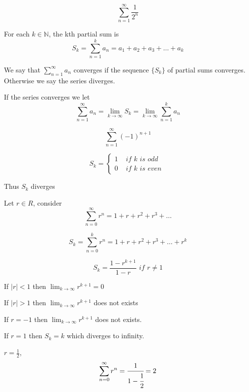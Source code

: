 \begin{exmp}
$$\sum_{n=1}^\infty \frac{1}{2^n}$$
\end{exmp}

\begin{defn}
For each $k\in \mathbb{N}$, the kth partial sum is $$S_k = \sum_{n=1}^k a_n = a_1+a_2+a_3+\dots + a_k$$

We say that $\sum_{n=1}^\infty a_n$ converges if the sequence $\{S_k\}$ of partial sums converges. Otherwise we say the series diverges.
\end{defn}

If the series converges we let $$\sum_{n=1}^\infty a_n = \lim_{k\to \infty} S_k = \lim_{k\to \infty} \sum_{n=1}^k a_n$$

\begin{exmp}
 $$\sum_{n=1}^\infty (-1)^{n+1}$$
 
\begin{equation*}
    S_k = \begin{cases}
        1 & \textit{ if k is odd }\\
        0 & \textit{ if k is even }
    \end{cases}
\end{equation*}
\end{exmp}

Thus $S_k$ diverges


Let $r\in R$, consider 
$$\sum_{n=0}^\infty r^n = 1+ r+r^2+r^3+\dots$$

$$S_k = \sum_{n=0}^k r^n = 1+ r+r^2+r^3+\dots+r^k$$

$$S_k = \frac{1-r^{k+1}}{1-r} \textit{ if } r \neq 1$$

\begin{note}

If $|r|< 1$ then $\lim_{k\to\infty} r^{k+1} = 0$

If $|r|> 1$ then $\lim_{k\to\infty} r^{k+1} $ does not exists

If $r = -1$ then $\lim_{k\to\infty} r^{k+1} $ does not exists.

If $r = 1 $ then $S_k = k$ which diverges to infinity.
\end{note}

\begin{exmp}
$r=\frac{1}{2}$, $$\sum_{n=0}^\infty r^n = \cfrac{1}{1-\cfrac{1}{2}}= 2$$
\end{exmp}





